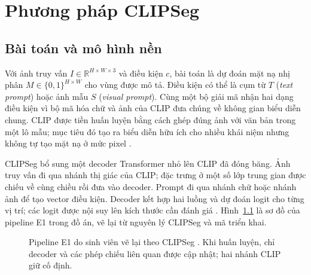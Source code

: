 \chapter{Phương pháp CLIPSeg}
\label{chap:method}

\section{Bài toán và mô hình nền}
Với ảnh truy vấn $I\in\mathbb{R}^{H\times W\times3}$ và điều kiện $c$, bài toán là dự đoán mặt nạ nhị phân $M\in\{0,1\}^{H\times W}$ cho vùng được mô tả. Điều kiện có thể là cụm từ $T$ (\emph{text prompt}) hoặc ảnh mẫu $S$ (\emph{visual prompt}). Cùng một bộ giải mã nhận hai dạng điều kiện vì bộ mã hóa chữ và ảnh của CLIP đưa chúng về không gian biểu diễn chung. CLIP được tiền huấn luyện bằng cách ghép đúng ảnh với văn bản trong một lô mẫu; mục tiêu đó tạo ra biểu diễn hữu ích cho nhiều khái niệm nhưng không tự tạo mặt nạ ở mức pixel \cite{radford2021clip,luddecke2022clipseg}.

CLIPSeg bổ sung một decoder Transformer nhỏ lên CLIP đã đóng băng. Ảnh truy vấn đi qua nhánh thị giác của CLIP; đặc trưng ở một số lớp trung gian được chiếu về cùng chiều rồi đưa vào decoder. Prompt đi qua nhánh chữ hoặc nhánh ảnh để tạo vector điều kiện. Decoder kết hợp hai luồng và dự đoán logit cho từng vị trí; các logit được nội suy lên kích thước cần đánh giá \cite{luddecke2022clipseg}. Hình~\ref{fig:architecture} là sơ đồ của pipeline E1 trong đồ án, vẽ lại từ nguyên lý CLIPSeg và mã triển khai.

\begin{figure}[htbp]
\centering
{}
\caption{Pipeline E1 do sinh viên vẽ lại theo CLIPSeg \cite{luddecke2022clipseg}. Khi huấn luyện, chỉ decoder và các phép chiếu liên quan được cập nhật; hai nhánh CLIP giữ cố định.}
\label{fig:architecture}
\end{figure}

